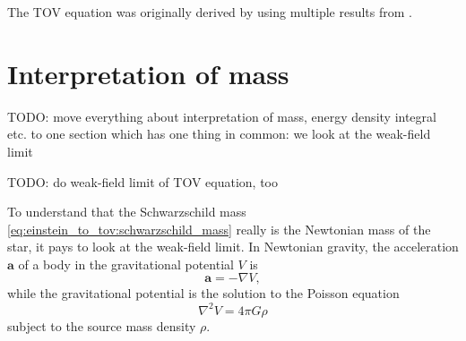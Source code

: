\documentclass[a4paper,11pt,twoside]{report}
\begin{document}
The TOV equation was originally derived by \cite{ref:tov} using multiple results from \cite{ref:tolman}.

\section{Interpretation of mass}

TODO: move everything about interpretation of mass, energy density integral etc. to one section which has one thing in common: we look at the weak-field limit

TODO: do weak-field limit of TOV equation, too

To understand that the Schwarzschild mass \eqref{eq:einstein_to_tov:schwarzschild_mass} really is the Newtonian mass of the star, it pays to look at the weak-field limit.
In Newtonian gravity, the acceleration $\mathbf{a}$ of a body in the gravitational potential $V$ is
\begin{equation}
	\mathbf{a} = - \nabla V ,
	\label{eq:interpretation_m:newton2}
\end{equation}
while the gravitational potential is the solution to the Poisson equation
\begin{equation}
	\nabla^2 V = 4 \pi G \rho
	\label{eq:interpretation_m:poisson}
\end{equation}
subject to the source mass density $\rho$.
\end{document}
